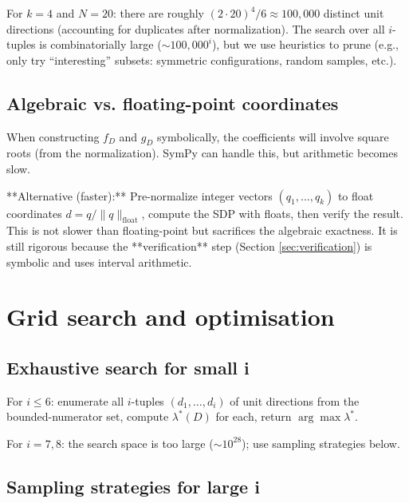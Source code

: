 \documentclass[12pt,a4paper]{article}
\begin{document}
For $k=4$ and $N=20$: there are roughly $(2 \cdot 20)^4 / 6 \approx 100,000$ distinct unit
directions (accounting for duplicates after normalization). The search over all $i$-tuples
is combinatorially large ($\sim 100,000^i$), but we use heuristics to prune (e.g., only try
``interesting'' subsets: symmetric configurations, random samples, etc.).

\subsection*{Algebraic vs. floating-point coordinates}

When constructing $f_D$ and $g_D$ symbolically, the coefficients will involve square roots
(from the normalization).  SymPy can handle this, but arithmetic becomes slow.

**Alternative (faster):** Pre-normalize integer vectors $(q_1, \ldots, q_k)$ to float
coordinates $d = q / \|q\|_{\text{float}}$, compute the SDP with floats, then verify
the result.  This is not slower than floating-point but sacrifices the algebraic exactness.
It is still rigorous because the **verification** step (Section \ref{sec:verification})
is symbolic and uses interval arithmetic.

\section{Grid search and optimisation}
\label{sec:search}

\subsection*{Exhaustive search for small i}

For $i \leq 6$: enumerate all $i$-tuples $(d_1, \ldots, d_i)$ of unit directions from
the bounded-numerator set, compute $\lambda^*(D)$ for each, return $\arg\max \lambda^*$.

For $i=7, 8$: the search space is too large ($ \sim 10^{28}$); use sampling strategies below.

\subsection*{Sampling strategies for large i}
\end{document}
